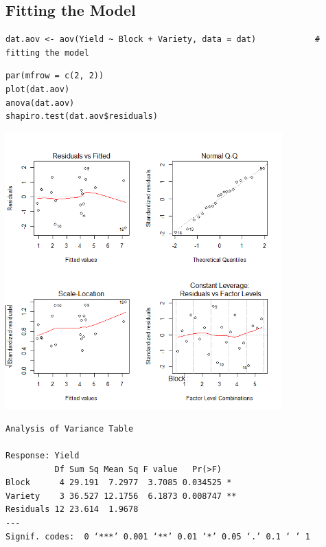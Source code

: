 \documentclass[a4paper, 10pt, fleqn, twosided]{memoir}
\begin{document}
\subsection{Fitting the Model}

\begin{tcolorbox}[title = Fitting the linear model for a RCBD]
\begin{verbatim}
dat.aov <- aov(Yield ~ Block + Variety, data = dat)            # fitting the model
\end{verbatim}

\tcblower
\begin{verbatim}
par(mfrow = c(2, 2))
plot(dat.aov)
anova(dat.aov)
shapiro.test(dat.aov$residuals)
\end{verbatim}
\end{tcolorbox}

\begin{tcolorbox}[title = Example 3 Output]
\includegraphics[width=0.8\textwidth, frame]{Example3Resplot.png}
\begin{verbatim}
Analysis of Variance Table

Response: Yield
          Df Sum Sq Mean Sq F value   Pr(>F)
Block      4 29.191  7.2977  3.7085 0.034525 *
Variety    3 36.527 12.1756  6.1873 0.008747 **
Residuals 12 23.614  1.9678
---
Signif. codes:  0 ‘***’ 0.001 ‘**’ 0.01 ‘*’ 0.05 ‘.’ 0.1 ‘ ’ 1
\end{verbatim}
\end{tcolorbox}
\end{document}
